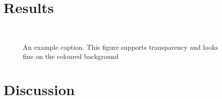 \documentclass[
]{dtuposter}
\begin{document}
\begin{dtupostercontent}
\section{Results}


\begin{figure}
	\centering
{}\\
\caption{An example caption. This figure supports transparency and looks fine on 
the coloured background}\label{fig:example}
\end{figure}

\section{Discussion}


\end{dtupostercontent}
\end{document}
